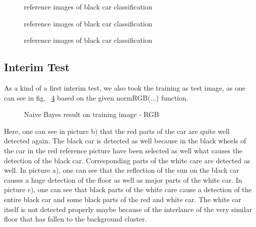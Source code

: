 \documentclass[a4paper,headings=small]{scrartcl}
\numberwithin{equation}{section} %
\numberwithin{figure}{section}   %
\newcommand{\generatedImgRoot}{../resources/img}
\newcommand{\generatedImgRootTwo}{../../../target}
\begin{document}
\begin{figure}
 \hfill
{}
\caption{reference images of black car classification}
\label{fig:label1}
\end{figure}
\begin{figure}
\hfill
{}
\caption{reference images of black car classification}
\label{fig:label2}
\end{figure}
\begin{figure}
\hfill
{}
\caption{reference images of black car classification}
\label{fig:label3}
\end{figure}

\subsection{Interim Test}
As a kind of a first interim test, we also took the training as test image,
as one can see in fig. ~\ref{fig:label5} based on the given normRGB(...) function.

\begin{figure}
\hfill
{}
\caption{Naive Bayes result on training image - RGB}
\label{fig:label5}
\end{figure}

Here, one can see in picture b) that the red parts of the car are quite well detected again.
The black car is detected as well because in the black wheels of the car in the 
red reference picture have been selected as well what causes the detection of the black car.
Corresponding parts of the white care are detected as well. 
In picture a), one can see that the reflection of the sun on the black car causes a huge
detection of the floor as well as major parts of the white car.
In picture c), one can see that black parts of the white care cause a detection of the 
entire black car and some black parts of the red and white car. 
The white car itself is not detected properly maybe because of the interlance of the
very similar floor that has fallen to the background cluster.
\end{document}
